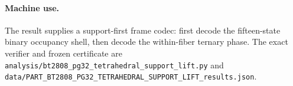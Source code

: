 \paragraph{Machine use.}
The result supplies a support-first frame codec: first decode the fifteen-state
binary occupancy shell, then decode the within-fiber ternary phase.  The exact
verifier and frozen certificate are
\texttt{analysis/bt2808\_pg32\_tetrahedral\_support\_lift.py} and
\texttt{data/PART\_BT2808\_PG32\_TETRAHEDRAL\_SUPPORT\_LIFT\_results.json}.
